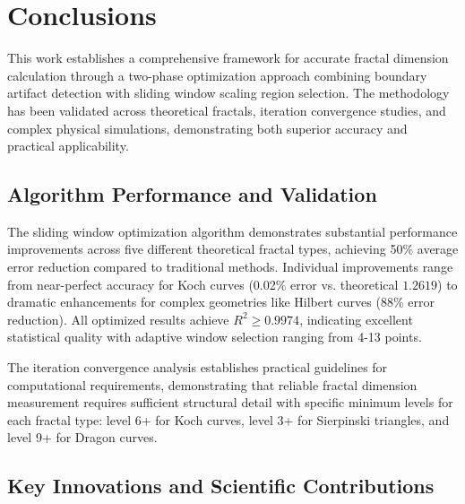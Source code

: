 \documentclass[preprint,12pt]{elsarticle}
\begin{document}
\section{Conclusions}
\label{sec:conclusions}

This work establishes a comprehensive framework for accurate fractal dimension calculation through a two-phase optimization approach combining boundary artifact detection with sliding window scaling region selection. The methodology has been validated across theoretical fractals, iteration convergence studies, and complex physical simulations, demonstrating both superior accuracy and practical applicability.

\subsection{Algorithm Performance and Validation}

The sliding window optimization algorithm demonstrates substantial performance improvements across five different theoretical fractal types, achieving 50\% average error reduction compared to traditional methods. Individual improvements range from near-perfect accuracy for Koch curves (0.02\% error vs. theoretical $1.2619$) to dramatic enhancements for complex geometries like Hilbert curves (88\% error reduction). All optimized results achieve $R^2 \geq 0.9974$, indicating excellent statistical quality with adaptive window selection ranging from 4-13 points.

The iteration convergence analysis establishes practical guidelines for computational requirements, demonstrating that reliable fractal dimension measurement requires sufficient structural detail with specific minimum levels for each fractal type: level 6+ for Koch curves, level 3+ for Sierpinski triangles, and level 9+ for Dragon curves.

\subsection{Key Innovations and Scientific Contributions}
\end{document}
